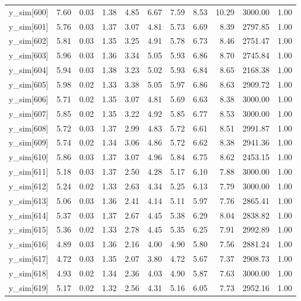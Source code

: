 \begin{table}[ht]
\begin{tabular}{rrrrrrrrrrr}
  y\_sim[600] & 7.60 & 0.03 & 1.38 & 4.85 & 6.67 & 7.59 & 8.53 & 10.29 & 3000.00 & 1.00 \\ 
  y\_sim[601] & 5.76 & 0.03 & 1.37 & 3.07 & 4.81 & 5.73 & 6.69 & 8.39 & 2797.85 & 1.00 \\ 
  y\_sim[602] & 5.81 & 0.03 & 1.35 & 3.25 & 4.91 & 5.78 & 6.73 & 8.46 & 2751.47 & 1.00 \\ 
  y\_sim[603] & 5.96 & 0.03 & 1.36 & 3.34 & 5.05 & 5.93 & 6.86 & 8.70 & 2745.84 & 1.00 \\ 
  y\_sim[604] & 5.94 & 0.03 & 1.38 & 3.23 & 5.02 & 5.93 & 6.84 & 8.65 & 2168.38 & 1.00 \\ 
  y\_sim[605] & 5.98 & 0.02 & 1.33 & 3.38 & 5.05 & 5.97 & 6.86 & 8.63 & 2909.72 & 1.00 \\ 
  y\_sim[606] & 5.71 & 0.02 & 1.35 & 3.07 & 4.81 & 5.69 & 6.63 & 8.38 & 3000.00 & 1.00 \\ 
  y\_sim[607] & 5.85 & 0.02 & 1.35 & 3.22 & 4.92 & 5.85 & 6.77 & 8.53 & 3000.00 & 1.00 \\ 
  y\_sim[608] & 5.72 & 0.03 & 1.37 & 2.99 & 4.83 & 5.72 & 6.61 & 8.51 & 2991.87 & 1.00 \\ 
  y\_sim[609] & 5.74 & 0.02 & 1.34 & 3.06 & 4.86 & 5.72 & 6.62 & 8.38 & 2941.36 & 1.00 \\ 
  y\_sim[610] & 5.86 & 0.03 & 1.37 & 3.07 & 4.96 & 5.84 & 6.75 & 8.62 & 2453.15 & 1.00 \\ 
  y\_sim[611] & 5.18 & 0.03 & 1.37 & 2.50 & 4.28 & 5.17 & 6.10 & 7.88 & 3000.00 & 1.00 \\ 
  y\_sim[612] & 5.24 & 0.02 & 1.33 & 2.63 & 4.34 & 5.25 & 6.13 & 7.79 & 3000.00 & 1.00 \\ 
  y\_sim[613] & 5.06 & 0.03 & 1.36 & 2.41 & 4.14 & 5.11 & 5.97 & 7.76 & 2865.41 & 1.00 \\ 
  y\_sim[614] & 5.37 & 0.03 & 1.37 & 2.67 & 4.45 & 5.38 & 6.29 & 8.04 & 2838.82 & 1.00 \\ 
  y\_sim[615] & 5.36 & 0.02 & 1.33 & 2.78 & 4.45 & 5.35 & 6.25 & 7.91 & 2992.89 & 1.00 \\ 
  y\_sim[616] & 4.89 & 0.03 & 1.36 & 2.16 & 4.00 & 4.90 & 5.80 & 7.56 & 2881.24 & 1.00 \\ 
  y\_sim[617] & 4.72 & 0.03 & 1.35 & 2.07 & 3.80 & 4.72 & 5.67 & 7.37 & 2908.73 & 1.00 \\ 
  y\_sim[618] & 4.93 & 0.02 & 1.34 & 2.36 & 4.03 & 4.90 & 5.87 & 7.63 & 3000.00 & 1.00 \\ 
  y\_sim[619] & 5.17 & 0.02 & 1.32 & 2.56 & 4.31 & 5.16 & 6.05 & 7.73 & 2952.16 & 1.00 \\ 

\end{tabular}
\end{table}
